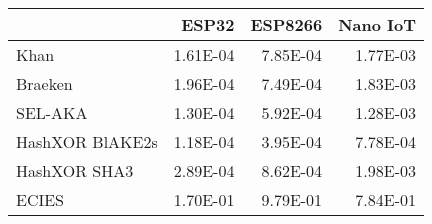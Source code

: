 \begin{tabular}{lrrr}
\toprule
{} &    ESP32 &  ESP8266 &  Nano IoT \\
\midrule
Khan            & 1.61E-04 & 7.85E-04 &  1.77E-03 \\
Braeken         & 1.96E-04 & 7.49E-04 &  1.83E-03 \\
SEL-AKA         & 1.30E-04 & 5.92E-04 &  1.28E-03 \\
HashXOR BlAKE2s & 1.18E-04 & 3.95E-04 &  7.78E-04 \\
HashXOR SHA3    & 2.89E-04 & 8.62E-04 &  1.98E-03 \\
ECIES           & 1.70E-01 & 9.79E-01 &  7.84E-01 \\
\bottomrule
\end{tabular}
